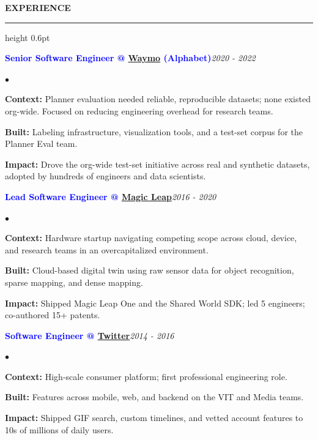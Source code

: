 \documentclass[10pt]{resume}
\newenvironment{rSectionCompact}[1]{
  \smallskip
  \vspace{0.1em}
  \textbf{\textcolor{Cerulean}{\MakeUppercase{#1}}}
  \vspace{0.2em}
  {\color{Blue}\hrule height 0.6pt}
  \vspace{0.6em}
  \begin{list}{}{
    \setlength{\leftmargin}{0em}
  }
  \item[]
}{
    \vspace{0.15em}
    \end{list}
}
\newenvironment{rJobCompact}[2]{
  \normalsize
  \textcolor{Blue}{\textbf{#1}}\hfill\textit{#2}
  \vspace{0.05em}
  \begin{list}{$\bullet$}{
    \setlength{\leftmargin}{1.6em}
    \setlength{\itemsep}{-0.1em}
    \setlength{\topsep}{0pt}
    \setlength{\partopsep}{0pt}
    \setlength{\parsep}{0pt}
  }
}{
    \end{list}
    \vspace{0.35em}
}
\begin{document}
\begin{rSectionCompact}{Experience}
    \begin{rJobCompact}{Senior Software Engineer @ \href{https://waymo.com}{Waymo} (Alphabet)}{2020 - 2022}
        \item \textbf{Context:} Planner evaluation needed reliable, reproducible datasets; none existed org-wide. Focused on reducing engineering overhead for research teams.
        \item \textbf{Built:} Labeling infrastructure, visualization tools, and a test-set corpus for the Planner Eval team.
        \item \textbf{Impact:} Drove the org-wide test-set initiative across real and synthetic datasets, adopted by hundreds of engineers and data scientists.
    \end{rJobCompact}

    \begin{rJobCompact}{Lead Software Engineer @ \href{https://magicleap.com}{Magic Leap}}{2016 - 2020}
        \item \textbf{Context:} Hardware startup navigating competing scope across cloud, device, and research teams in an overcapitalized environment.
        \item \textbf{Built:} Cloud-based digital twin using raw sensor data for object recognition, sparse mapping, and dense mapping.
        \item \textbf{Impact:} Shipped Magic Leap One and the Shared World SDK; led 5 engineers; co-authored 15+ patents.
    \end{rJobCompact}

    \begin{rJobCompact}{Software Engineer @ \href{https://twitter.com}{Twitter}}{2014 - 2016}
        \item \textbf{Context:} High-scale consumer platform; first professional engineering role.
        \item \textbf{Built:} Features across mobile, web, and backend on the VIT and Media teams.
        \item \textbf{Impact:} Shipped GIF search, custom timelines, and vetted account features to 10s of millions of daily users.
    \end{rJobCompact}

\end{rSectionCompact}

\end{document}
